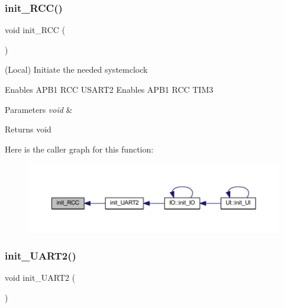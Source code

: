 \subsubsection{\texorpdfstring{init\+\_\+\+R\+C\+C()}{init\_RCC()}}
{\footnotesize\ttfamily void init\+\_\+\+R\+CC (\begin{DoxyParamCaption}\item[{void}]{ }\end{DoxyParamCaption})}



(Local) Initiate the needed systemclock 

Enables A\+P\+B1 R\+CC U\+S\+A\+R\+T2 Enables A\+P\+B1 R\+CC T\+I\+M3


\begin{DoxyParams}{Parameters}
{\em void} & \\
\hline
\end{DoxyParams}
\begin{DoxyReturn}{Returns}
void 
\end{DoxyReturn}
Here is the caller graph for this function\+:\nopagebreak
\begin{figure}[H]
\begin{center}
\leavevmode
\includegraphics[width=350pt]{namespace_u_a_r_t_a532deb6ee0fb4aa5ef9700438be59c0f_icgraph}
\end{center}
\end{figure}
\mbox{\label{namespace_u_a_r_t_ab8b1cbca4aa5321487c7f78df50efdc6}} 
\subsubsection{\texorpdfstring{init\+\_\+\+U\+A\+R\+T2()}{init\_UART2()}}
{\footnotesize\ttfamily void init\+\_\+\+U\+A\+R\+T2 (\begin{DoxyParamCaption}\item[{void}]{ }\end{DoxyParamCaption})}



